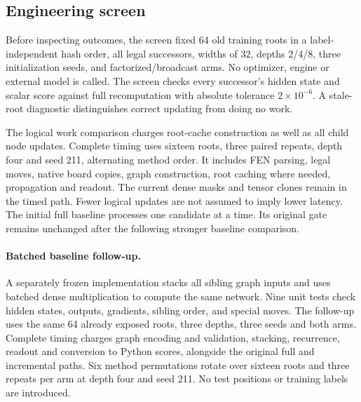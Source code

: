 \documentclass{article}
\begin{document}
\subsection{Engineering screen}
Before inspecting outcomes, the screen fixed 64 old training roots in a
label-independent hash order, all legal successors, widths of 32, depths
2/4/8, three initialization seeds, and factorized/broadcast arms. No optimizer,
engine or external model is called. The screen checks every successor's hidden
state and scalar score against full recomputation with absolute tolerance
$2\times10^{-6}$. A stale-root diagnostic distinguishes correct updating from
doing no work.

The logical work comparison charges root-cache construction as well as all
child node updates. Complete timing uses sixteen roots, three paired repeats,
depth four and seed 211, alternating method order. It includes FEN parsing,
legal moves, native board copies, graph construction, root caching where needed,
propagation and readout. The current dense masks and tensor clones remain in
the timed path. Fewer logical updates are not assumed to imply lower latency.
The initial full baseline processes one candidate at a time. Its original gate
remains unchanged after the following stronger baseline comparison.


\LocalResults{}

\paragraph{Batched baseline follow-up.}
A separately frozen implementation stacks all sibling graph inputs and uses
batched dense multiplication to compute the same network. Nine unit tests check
hidden states, outputs, gradients, sibling order, and special moves. The follow-up
uses the same 64 already exposed roots, three depths, three seeds and both arms.
Complete timing charges graph encoding and validation, stacking, recurrence,
readout and conversion to Python scores, alongside the original full and
incremental paths. Six method permutations rotate over sixteen roots and three
repeats per arm at depth four and seed 211. No test positions or training labels
are introduced. \BatchResults{}


\end{document}
